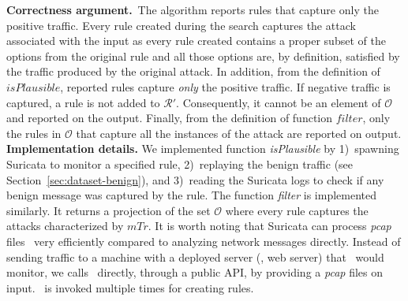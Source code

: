 \documentclass[conference]{IEEEtran}
\begin{document}
\textbf{Correctness argument.}~The algorithm reports rules that
capture only the positive traffic. Every rule created during the
search captures the attack associated with the input as every rule
created contains a proper subset of the options from the original rule
and all those options are, by definition, satisfied by the traffic
produced by the original attack. In addition, from the definition of
$\mathit{isPlausible}$, reported rules capture \emph{only} the
positive traffic. If negative traffic is captured, a rule is not added
to $\mathcal R'$. Consequently, it cannot be an element of $\mathcal
O$ and reported on the output. Finally, from the definition of
function $\mathit{filter}$, only the rules in $\mathcal O$ that
capture all the instances of the attack are reported on output.
\textbf{Implementation details.} We implemented function
\emph{isPlausible} by 1)~spawning Suricata to monitor a specified
rule, 2)~replaying the benign traffic (see
Section~\ref{sec:dataset-benign}), and 3)~reading the Suricata logs to
check if any benign message was captured by the rule. The function
\emph{filter} is implemented similarly. It returns a projection of the
set $\mathcal O$ where every rule captures the attacks characterized
by $\mathit{mTr}$. It is worth noting that Suricata can process
\emph{pcap} files~\cite{pcap} very efficiently compared to analyzing
network messages directly. Instead of sending traffic to a machine
with a deployed server (\eg{}, web server) that \suri\ would monitor,
we calls \suri\ directly, through a public API, by providing a
\emph{pcap} files on input. \suri\ is invoked multiple times for
creating rules.




\end{document}
